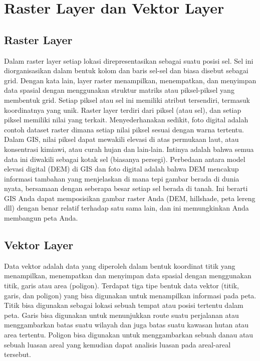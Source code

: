 

\section{Raster Layer dan Vektor Layer}

\subsection{Raster Layer}
Dalam raster layer  setiap lokasi direpresentasikan sebagai suatu posisi sel. 
Sel ini diorganisasikan dalam bentuk kolom dan baris sel-sel dan biasa disebut sebagai grid. 
Dengan kata lain,  layer raster menampilkan, menempatkan, 
dan menyimpan data spasial dengan menggunakan struktur matriks atau piksel-piksel yang membentuk grid. 
Setiap piksel atau sel ini memiliki atribut tersendiri, termasuk koordinatnya yang unik.
Raster layer terdiri dari piksel (atau sel), dan setiap piksel memiliki nilai yang terkait. Menyederhanakan sedikit, foto digital adalah contoh dataset raster dimana setiap nilai piksel sesuai dengan warna tertentu. Dalam GIS, nilai piksel dapat mewakili elevasi di atas permukaan laut, atau konsentrasi kimiawi, atau curah hujan dan lain-lain. Intinya adalah bahwa semua data ini diwakili sebagai kotak sel (biasanya persegi). Perbedaan antara model elevasi digital (DEM) di GIS dan foto digital adalah bahwa DEM mencakup informasi tambahan yang menjelaskan di mana tepi gambar berada di dunia nyata, bersamaan dengan seberapa besar setiap sel berada di tanah. Ini berarti GIS Anda dapat memposisikan gambar raster Anda (DEM, hillshade, peta lereng dll) dengan benar relatif terhadap satu sama lain, dan ini memungkinkan Anda membangun peta Anda.


\subsection{Vektor Layer}
Data vektor adalah data yang diperoleh dalam bentuk koordinat titik yang menampilkan, 
menempatkan dan menyimpan data spasial dengan menggunakan titik, garis atau area (poligon). 
Terdapat tiga tipe bentuk data vektor (titik, garis, dan poligon) yang bisa digunakan untuk menampilkan informasi pada peta. 
Titik bisa digunakan sebagai lokasi sebuah tempat atau posisi tertentu dalam peta. 
Garis bisa digunakan untuk menunjukkan route suatu perjalanan atau menggambarkan batas suatu wilayah 
dan juga batas suatu kawasan hutan atau area tertentu. 
Poligon bisa digunakan untuk menggambarkan sebuah danau atau sebuah luasan areal yang kemudian dapat analisis luasan 
pada areal-areal tersebut.

